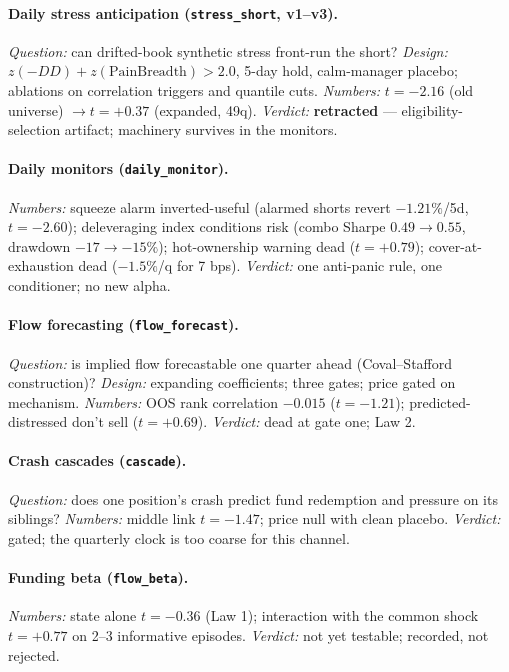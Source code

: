 \paragraph{Daily stress anticipation (\texttt{stress\_short},
v1--v3).}
\emph{Question:} can drifted-book synthetic stress front-run the
short? \emph{Design:} $z(-DD)+z(\mathrm{PainBreadth})>2.0$, 5-day
hold, calm-manager placebo; ablations on correlation triggers and
quantile cuts. \emph{Numbers:} $t=-2.16$ (old universe)
$\to t=+0.37$ (expanded, 49q). \emph{Verdict:} \textbf{retracted}
--- eligibility-selection artifact; machinery survives in the
monitors.

\paragraph{Daily monitors (\texttt{daily\_monitor}).}
\emph{Numbers:} squeeze alarm inverted-useful (alarmed shorts revert
$-1.21\%$/5d, $t=-2.60$); deleveraging index conditions risk (combo
Sharpe $0.49\to0.55$, drawdown $-17\to-15\%$); hot-ownership warning
dead ($t=+0.79$); cover-at-exhaustion dead ($-1.5\%$/q for 7 bps).
\emph{Verdict:} one anti-panic rule, one conditioner; no new alpha.

\paragraph{Flow forecasting (\texttt{flow\_forecast}).}
\emph{Question:} is implied flow forecastable one quarter ahead
(Coval--Stafford construction)? \emph{Design:} expanding
coefficients; three gates; price gated on mechanism.
\emph{Numbers:} OOS rank correlation $-0.015$ ($t=-1.21$);
predicted-distressed don't sell ($t=+0.69$). \emph{Verdict:} dead at
gate one; Law 2.

\paragraph{Crash cascades (\texttt{cascade}).}
\emph{Question:} does one position's crash predict fund redemption
and pressure on its siblings? \emph{Numbers:} middle link $t=-1.47$;
price null with clean placebo. \emph{Verdict:} gated; the quarterly
clock is too coarse for this channel.

\paragraph{Funding beta (\texttt{flow\_beta}).}
\emph{Numbers:} state alone $t=-0.36$ (Law 1); interaction with the
common shock $t=+0.77$ on 2--3 informative episodes.
\emph{Verdict:} not yet testable; recorded, not rejected.

